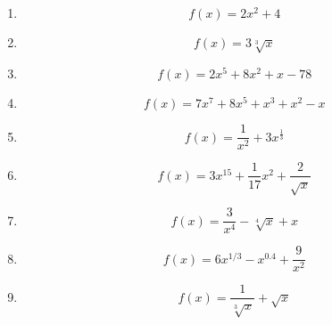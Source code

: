 				\begin{multicols}{2}
					\begin{enumerate}
						
						\item		 \[ f(x) = 2x^2 + 4\,\] %
						\item		 \[ f(x) = 3\sqrt[3]{x}\, \]
						\item		 \[ f(x) = 2x^5+8x^2+x-78\,\] %
						\item		 \[ f(x) = 7x^7+8x^5+x^3+x^2-x\,\] %
						\item		\[ f(x) = \frac{1}{x^2}+3x^\frac{1}{3}\,\] %
						
						\item		 \[ f(x) = 3x^{15} + \frac{1}{17}x^2 +\frac{2}{\sqrt{x}} \,\] %
						\item		 \[ f(x) = \frac{3}{x^4} - \sqrt[4]{x} + x \,\] %
						\item		 \[ f(x) = 6x^{1/3}-x^{0.4} +\frac{9}{x^2} \,\] %
						\item		 \[ f(x) = \frac{1}{\sqrt[3]{x}} + \sqrt{x} \,\] %
					\end{enumerate}
				\end{multicols}
				\newpage
